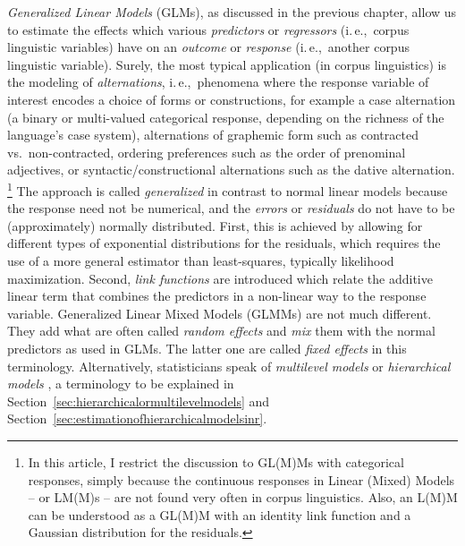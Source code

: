 \documentclass[a4paper,12pt]{article}
\newcommand{\ie}{i.\,e.,\ }
\begin{document}
\textit{Generalized Linear Models} (GLMs), as discussed in the previous chapter, allow us to estimate the effects which various \textit{predictors} or \textit{regressors} (\ie corpus linguistic variables) have on an \textit{outcome} or \textit{response} (\ie another corpus linguistic variable).
Surely, the most typical application (in corpus linguistics) is the modeling of \textit{alternations}, \ie phenomena where the response variable of interest encodes a choice of forms or constructions, for example a case alternation (a binary or multi-valued categorical response, depending on the richness of the language's case system), alternations of graphemic form such as contracted vs.\ non-contracted, ordering preferences such as the order of prenominal adjectives, or syntactic\slash constructional alternations such as the dative alternation.%
\footnote{In this article, I restrict the discussion to GL(M)Ms with categorical responses, simply because the continuous responses in Linear (Mixed) Models -- or LM(M)s – are not found very often in corpus linguistics.
Also, an L(M)M can be understood as a GL(M)M with an identity link function and a Gaussian distribution for the residuals.}
The approach is called \textit{generalized} in contrast to normal linear models because the response need not be numerical, and the \textit{errors} or \textit{residuals} do not have to be (approximately) normally distributed.
First, this is achieved by allowing for different types of exponential distributions for the residuals, which requires the use of a more general estimator than least-squares, typically likelihood maximization.
Second, \textit{link functions} are introduced which relate the additive linear term that combines the predictors in a non-linear way to the response variable.
Generalized Linear Mixed Models (GLMMs) are not much different.
They add what are often called \textit{random effects} and \textit{mix} them with the normal predictors as used in GLMs.
The latter one are called \textit{fixed effects} in this terminology.
Alternatively, statisticians speak of \textit{multilevel models} or \textit{hierarchical models} \citep{GelmanHill2006}, a terminology to be explained in Section~\ref{sec:hierarchicalormultilevelmodels} and Section~\ref{sec:estimationofhierarchicalmodelsinr}.
\end{document}
